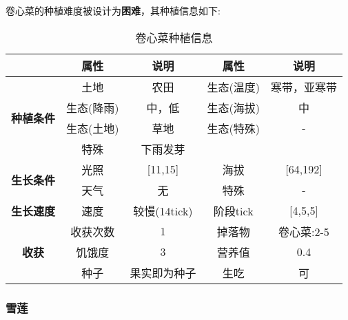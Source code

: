 卷心菜的种植难度被设计为\textbf{困难}，其种植信息如下:

\begin{table}[H]
    \centering
    \caption{卷心菜种植信息}
    \label{table:卷心菜种植信息}
    \setlength{\tabcolsep}{4mm}
    \begin{tabular}{c|cc|cc}
        \toprule
                                           & \textbf{属性} & \textbf{说明} & \textbf{属性} & \textbf{说明} \\
        \midrule
        \multirow{4}{*}{\textbf{种植条件}} & 土地          & 农田          & 生态(温度)    & 寒带，亚寒带    \\
                                           & 生态(降雨)    & 中，低        & 生态(海拔)    & 中            \\
                                           & 生态(土地)    & 草地          & 生态(特殊)    & -             \\
                                           & 特殊          & 下雨发芽                              \\
        \midrule
        \multirow{2}{*}{\textbf{生长条件}} & 光照          & [11,15]        & 海拔          & [64,192]      \\
                                           & 天气          & 无            & 特殊          & -             \\
        \midrule
        \textbf{生长速度}                  & 速度          & 较慢(14tick)     & 阶段tick      & [4,5,5]       \\
        \midrule
        \multirow{3}{*}{\textbf{收获}}     & 收获次数      & 1             & 掉落物        & 卷心菜:2-5      \\
                                           & 饥饿度        & 3             & 营养值        & 0.4           \\
                                           & 种子          & 果实即为种子  & 生吃          & 可 \\
        \bottomrule
    \end{tabular}
\end{table}

\subsubsection{雪莲}

